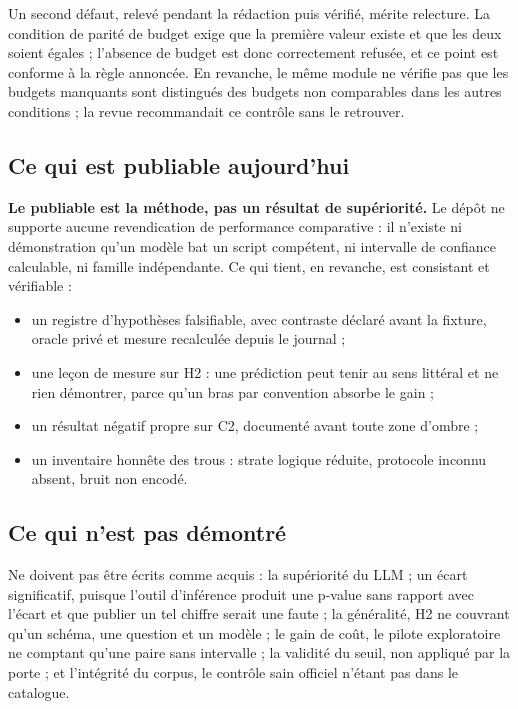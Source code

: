 Un second défaut, relevé pendant la rédaction puis vérifié, mérite relecture. La
condition de parité de budget exige que la première valeur existe et que les
deux soient égales ; l'absence de budget est donc correctement refusée, et ce
point est conforme à la règle annoncée. En revanche, le même module ne vérifie
pas que les budgets manquants sont distingués des budgets non comparables dans
les autres conditions ; la revue recommandait ce contrôle sans le retrouver.

\subsection{Ce qui est publiable aujourd'hui}

\textbf{Le publiable est la méthode, pas un résultat de supériorité.} Le dépôt ne
supporte aucune revendication de performance comparative : il n'existe ni
démonstration qu'un modèle bat un script compétent, ni intervalle de confiance
calculable, ni famille indépendante. Ce qui tient, en revanche, est consistant
et vérifiable :

\begin{itemize}
\item un registre d'hypothèses falsifiable, avec contraste déclaré avant la
fixture, oracle privé et mesure recalculée depuis le journal ;
\item une leçon de mesure sur H2 : une prédiction peut tenir au sens littéral et
ne rien démontrer, parce qu'un bras par convention absorbe le gain ;
\item un résultat négatif propre sur C2, documenté avant toute zone d'ombre ;
\item un inventaire honnête des trous : strate logique réduite, protocole
inconnu absent, bruit non encodé.
\end{itemize}

\subsection{Ce qui n'est pas démontré}

Ne doivent pas être écrits comme acquis : la supériorité du LLM ; un écart
significatif, puisque l'outil d'inférence produit une p-value sans rapport avec
l'écart et que publier un tel chiffre serait une faute ; la généralité, H2 ne
couvrant qu'un schéma, une question et un modèle ; le gain de coût, le pilote
exploratoire ne comptant qu'une paire sans intervalle ; la validité du seuil,
non appliqué par la porte ; et l'intégrité du corpus, le contrôle sain officiel
n'étant pas dans le catalogue.

